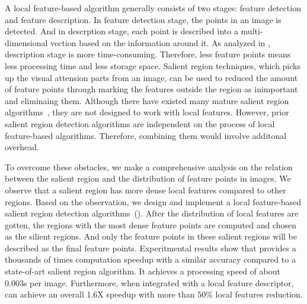 A local feature-based algorithm generally consists of two stages: feature detection and feature description. In feature detection stage, the points in  an image is detected. And in descrption stage, each point is described into a multi-dimensional vection based on the information around it. As analyzed in \cite{adaptivepipelineicpp2012}, description stage is more time-consuming. Therefore, less feature points means  less processing time and less storage space. Salient region techniques, which picks up the visual attension parts from an image, can be used to reduced the amount of feature points through marking the features outside the region as inimportant and eliminaing them. Although there have existed many mature salient region algorithms~\cite{cheng2011global,achanta2009frequency,itti1998model}, they are not designed to work with local features. However, prior salient region detection algorithms are independent on the process of local feature-based algorithms. Therefore,  combining them would involve additonal overhead.


To overcome these obstacles, we make a comprehensive analysis on the relation between the salient region and the distribution of feature points  in images. We observe that a salient region has more dense local features compared to other regions. Based on the observation, we design and implement a local feature-based salient region detection algorithms~({\sys}). After the distribution of local features are gotten, the regions with the most dense feature points are computed and chosen as the silient regions. And only the feature points in these salient regions will be described as the final feature points.  Experitmental results show that {\sys} provides a thousands of times computation speedup with a similar accuracy compared to a state-of-art salient region algorithm. It achieves a processing speed of about 0.003s per image. Furthermore, when integrated with a local feature descriptor, {\sys} can achieve an overall 1.6X speedup with more than 50\% local features reduction.






